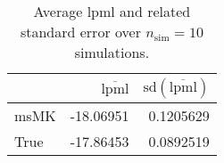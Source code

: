 \begin{table}[H]

\caption{Average lpml and related standard error over $n_{\text{sim}} = 10$ simulations.}
\centering
\begin{tabular}[t]{lrr}
\toprule
  & $\overbar{\text{lpml}}$ & $\text{sd}(\overbar{\text{lpml}})$\\
\midrule
msMK & -18.06951 & 0.1205629\\
True & -17.86453 & 0.0892519\\
\bottomrule
\end{tabular}
\end{table}
